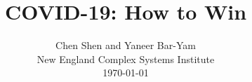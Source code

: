 \documentclass[onecolumn,journal]{IEEEtran}
\begin{document}
\title{\color{Brown} COVID-19: How to Win \\
\vspace{-0.35ex}}
\author{Chen Shen and Yaneer Bar-Yam \\ New England Complex Systems Institute \\
 \today 
  \vspace{-14ex} \\ 

   
\bigskip
\bigskip

\textbf{}
 }
    
\maketitle


\flushbottom %



\thispagestyle{empty} %




\renewcommand{\thefootnote}{\fnsymbol{footnote}}
\end{document}
